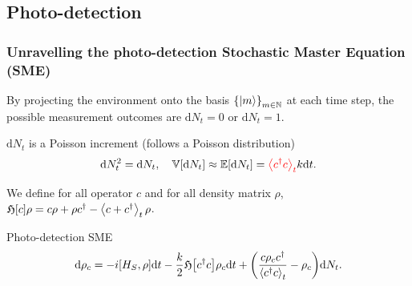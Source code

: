 \documentclass[10pt,xcolor=table]{beamer}
\theoremstyle{definition}
\begin{document}
\subsection{Photo-detection}
\begin{frame}
	\frametitle{Unravelling the photo-detection Stochastic Master Equation (SME)}
	By projecting the environment onto the basis $\qty{\ket{m}}_{m\in\mathbb{N}}$ at each time step, the possible measurement outcomes are $\mathrm{d}N_t=0$ or $\mathrm{d}N_t=1$.
	\begin{block}{$\mathrm{d}N_t$ is a Poisson increment (follows a Poisson distribution)}
		\begin{equation*}
			\mathrm{d}N_t^2=\mathrm{d}N_t,\quad \mathbb{V}\qty[\mathrm{d}N_t]\approx\mathbb{E}\qty[\mathrm{d}N_t]=\textcolor{red}{\expval{c^\dagger c}_t} k \mathrm{d}t.
		\end{equation*}
	\end{block}
	We define for all operator $c$ and for all density matrix $\rho$, $\mathfrak{H}[c]\rho = c\rho+\rho c^\dagger - \expval{c+c^\dagger}_t \rho$.
	\begin{alertblock}{Photo-detection SME}
		\begin{equation*}
			\mathrm{d}\rho_c = -i\qty[H_S, \rho]\mathrm{d}t-\frac{k}{2}\mathfrak{H}\qty[c^\dagger c]\rho_c\mathrm{d}t + \qty(\frac{c\rho_c c^\dagger}{\expval{c^\dagger c}_t}-\rho_c)\mathrm{d}N_t.
		\end{equation*}
	\end{alertblock}
\end{frame}
\end{document}
